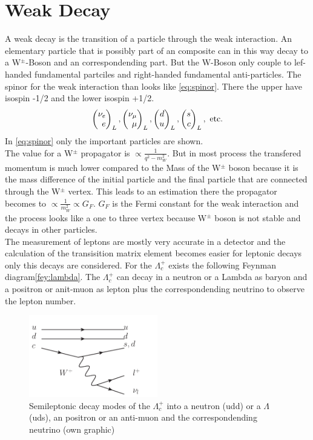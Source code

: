 \section{Weak Decay}
A weak decay is the transition of a particle through the weak interaction. An 
elementary particle that is possibly part of an composite can in this 
way decay to a W\(^\pm\)-Boson and an correspondending part. But the W-Boson only 
couple to lef-handed fundamental partciles and right-handed fundamental 
anti-particles. The spinor for the weak interaction than looks like 
{\eqref{eq:spinor}}. There the upper have isospin -1/2 and the lower isospin 
+1/2.
\begin{equation}
  \Spvek{\nu_e; e}_L,\Spvek{\nu_\mu; \mu}_L, \Spvek{d; u}_L, \Spvek{s; c}_L, 
  \text{ etc.} \label{eq:spinor}
\end{equation}
In {\eqref{eq:spinor}} only the important particles are shown.\\
The value for a W\(^\pm\) propagator is \(\propto \frac{1}{q^2 - m_W^2}\). But 
in most process the transfered momentum is much lower compared to the Mass of 
the W\(^\pm\) boson because it is the mass 
difference of the initial particle and the final particle that are connected 
through the W\(^\pm\) vertex. This leads to an estimation there the propagator 
becomes to \(\propto \frac{1}{m_W^2} \propto G_F\). \(G_F\) is the Fermi constant 
for the weak interaction and the process looks like a one to three vertex because 
W\(^\pm\) boson is not stable and decays in other particles.\\
The measurement of leptons are mostly very accurate in a detector and 
the calculation of the transisition matrix element becomes easier for leptonic 
decays only this decays are considered. For the \(\Lambda_c^+\) exists the 
following Feynman diagram{\eqref{fey:lambda}}. The \(\Lambda_c^+\) can decay 
in a neutron or a Lambda as baryon and a positron or anit-muon as lepton plus 
the correspondending neutrino to observe the lepton number.
\begin{figure}[h]
  \centering
  \includegraphics[page=1, width=0.5\textwidth]{semileptonic_lambdac+}
  \caption{Semileptonic decay modes of the \(\Lambda_c^+\) into a neutron (udd)
  or a \(\Lambda\) (uds), an positron or an anti-muon and the correspondending 
  neutrino (own graphic)}\label{fey:lambda}
\end{figure}

